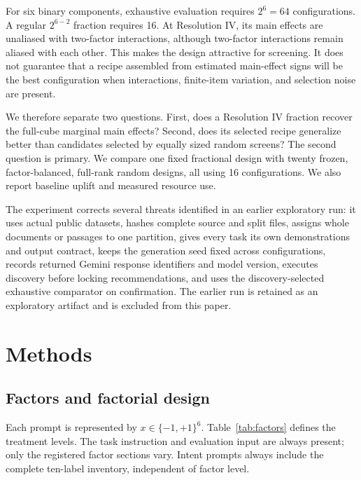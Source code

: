 \documentclass[11pt,a4paper]{article}
\begin{document}
For six binary components, exhaustive evaluation requires $2^6=64$ configurations. A regular $2^{6-2}$ fraction requires 16. At Resolution IV, its main effects are unaliased with two-factor interactions, although two-factor interactions remain aliased with each other. This makes the design attractive for screening. It does not guarantee that a recipe assembled from estimated main-effect signs will be the best configuration when interactions, finite-item variation, and selection noise are present.

We therefore separate two questions. First, does a Resolution IV fraction recover the full-cube marginal main effects? Second, does its selected recipe generalize better than candidates selected by equally sized random screens? The second question is primary. We compare one fixed fractional design with twenty frozen, factor-balanced, full-rank random designs, all using 16 configurations. We also report baseline uplift and measured resource use.

The experiment corrects several threats identified in an earlier exploratory run: it uses actual public datasets, hashes complete source and split files, assigns whole documents or passages to one partition, gives every task its own demonstrations and output contract, keeps the generation seed fixed across configurations, records returned Gemini response identifiers and model version, executes discovery before locking recommendations, and uses the discovery-selected exhaustive comparator on confirmation. The earlier run is retained as an exploratory artifact and is excluded from this paper.

\section{Methods}
\subsection{Factors and factorial design}

Each prompt is represented by $x\in\{-1,+1\}^6$. Table~\ref{tab:factors} defines the treatment levels. The task instruction and evaluation input are always present; only the registered factor sections vary. Intent prompts always include the complete ten-label inventory, independent of factor level.
\end{document}
